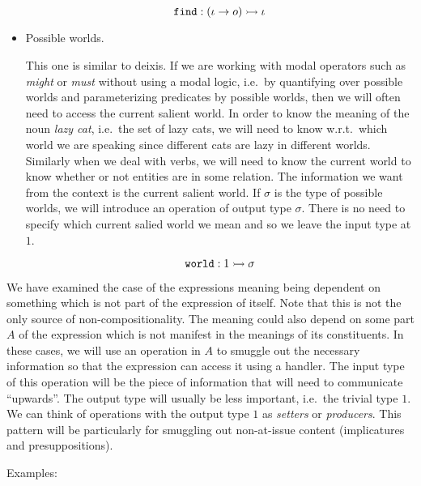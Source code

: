 \begin{itemize}
  $$
  \mathtt{find} : (\iota \to o) \rightarrowtail \iota
  $$

\item Possible worlds.
  
  This one is similar to deixis. If we are working with modal operators
  such as \emph{might} or \emph{must} without using a modal logic, i.e.\ by
  quantifying over possible worlds and parameterizing predicates by
  possible worlds, then we will often need to access the current salient
  world. In order to know the meaning of the noun \emph{lazy cat}, i.e.\
  the set of lazy cats, we will need to know w.r.t.\ which world we are
  speaking since different cats are lazy in different worlds. Similarly
  when we deal with verbs, we will need to know the current world to know
  whether or not entities are in some relation. The information we want
  from the context is the current salient world. If $\sigma$ is the type of
  possible worlds, we will introduce an operation of output type
  $\sigma$. There is no need to specify which current salied world we mean
  and so we leave the input type at $1$.
  
  $$
  \mathtt{world} : 1 \rightarrowtail \sigma
  $$
\end{itemize}

We have examined the case of the expressions meaning being dependent on
something which is not part of the expression of itself. Note that this is
not the only source of non-compositionality. The meaning could also depend
on some part $A$ of the expression which is not manifest in the meanings of
its constituents. In these cases, we will use an operation in $A$ to
smuggle out the necessary information so that the expression can access it
using a handler. The input type of this operation will be the piece of
information that will need to communicate ``upwards''. The output type will
usually be less important, i.e.\ the trivial type $1$. We can think of
operations with the output type $1$ as \emph{setters} or
\emph{producers}. This pattern will be particularly for smuggling out
non-at-issue content (implicatures and presuppositions).

Examples:

